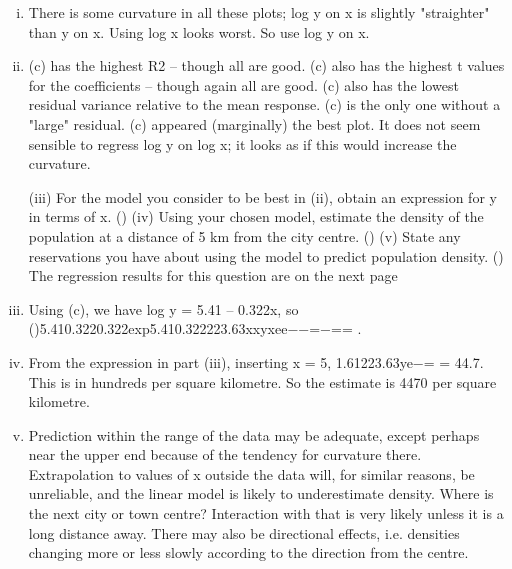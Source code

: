 \documentclass[a4paper,12pt]{article}
\begin{document}
\begin{enumerate}[(i)]
\item There is some curvature in all these plots; log y on x is slightly "straighter" than y on x. Using log x looks worst. So use log y on x.
\item  (c) has the highest R2 – though all are good.
(c) also has the highest t values for the coefficients – though again all are good.
(c) also has the lowest residual variance relative to the mean response.
(c) is the only one without a "large" residual.
(c) appeared (marginally) the best plot.
It does not seem sensible to regress log y on log x; it looks as if this would increase the curvature.

\newpage
\begin{framed}
(iii) For the model you consider to be best in (ii), obtain an expression for y in
terms of x.
()
(iv) Using your chosen model, estimate the density of the population at a distance
of 5 km from the city centre.
()
(v) State any reservations you have about using the model to predict population
density.
()
The regression results for this question are on the next page
\end{framed}

\item Using (c), we have log y = 5.41 – 0.322x, so
()5.410.3220.322exp5.410.322223.63xxyxee−−=−== .
\item  From the expression in part (iii), inserting x = 5, 1.61223.63ye−= = 44.7. This is in hundreds per square kilometre. So the estimate is 4470 per square kilometre.
\item Prediction within the range of the data may be adequate, except perhaps near the upper end because of the tendency for curvature there. Extrapolation to values of x outside the data will, for similar reasons, be unreliable, and the linear model is likely to underestimate density. Where is the next city or town centre? Interaction with that is very likely unless it is a long distance away. There may also be directional effects, i.e. densities changing more or less slowly according to the direction from the centre.
 \end{enumerate}
 
\end{document}
